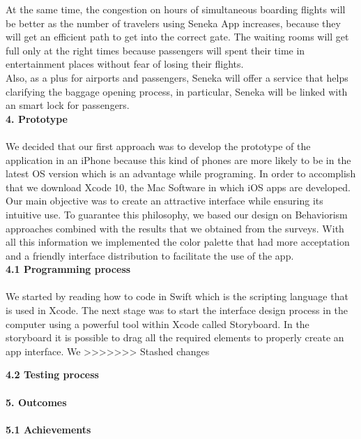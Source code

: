 \documentclass[]{article}
\begin{document}
At the same time, the congestion on hours of simultaneous boarding flights will be better as the number of travelers using Seneka App increases, because they will get an efficient path to get into the correct gate. The waiting rooms will get full only at the right times because passengers will spent their time in entertainment places without fear of losing their flights.\\

Also, as a plus for airports and passengers, Seneka will offer a service that helps clarifying the baggage opening process, in particular, Seneka will be linked with an smart lock for passengers.\\  

\Large{\textbf{4. Prototype}\\}\\

We decided that our first approach was to develop the prototype of the application in an iPhone because this kind of phones are more likely to be in the latest OS version which is an advantage while programing. In order to accomplish that we download Xcode 10, the Mac Software in which iOS apps are developed. Our main objective was to create an attractive interface while ensuring its intuitive use. To guarantee this philosophy, we based our design on Behaviorism approaches combined with the results that we obtained from the surveys. With all this information we implemented the color palette that had more acceptation and a friendly interface distribution to facilitate the use of the app. \\

\Large{\textbf{4.1 Programming process}\\}\\

We started by reading how to code in Swift which is the scripting language that is used in Xcode. The next stage was to start the interface design process in the computer using a powerful tool within Xcode called Storyboard. In the storyboard it is possible to drag all the required elements to properly create an app interface. We 
>>>>>>> Stashed changes

\Large{\textbf{4.2 Testing process}\\}\\


\Large{\textbf{5. Outcomes}\\}\\

\Large{\textbf{5.1 Achievements}\\}
\end{document}
